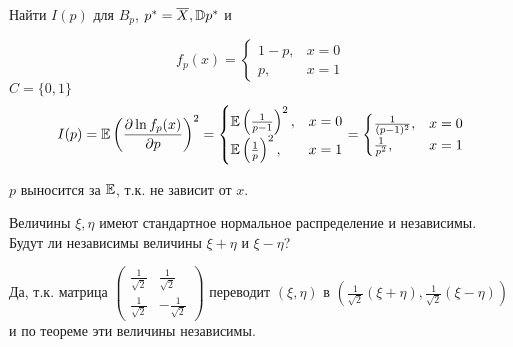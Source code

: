 

\cfoot{}



\begin{exercise}
    Найти \(I(p)\) для \(B_p\), \(p^* = \overline{X}, \mathbb{D} p^*\) и \?
\end{exercise}
\begin{solution}
    \[f_p(x) = \begin{cases}
        1 - p, & x = 0 \\
        p, & x = 1
    \end{cases}\]
    \(C = \{0, 1\}\)
    \[I(p) = \mathbb{E} \left(\frac{\partial \ln f_p(x)}{\partial p}\right)^2 = \begin{cases}
        \mathbb{E} \left(\frac{1}{p - 1}\right)^2, & x = 0 \\
        \mathbb{E} \left(\frac{1}{p}\right)^2, & x = 1
    \end{cases} = \begin{cases}
        \frac{1}{(p - 1)^2}, & x = 0 \\
        \frac{1}{p^2}, & x = 1
    \end{cases}\]
    
    \(p\) выносится за \(\mathbb{E}\), т.к. не зависит от \(x\).
\end{solution}

\begin{exercise}
    Величины \(\xi, \eta\) имеют стандартное нормальное распределение и независимы. Будут ли независимы величины \(\xi + \eta\) и \(\xi - \eta\)?
\end{exercise}
\begin{solution}
    Да, т.к. матрица \(\begin{pmatrix}
        \frac{1}{\sqrt{2}} & \frac{1}{\sqrt{2}} \\
        \frac{1}{\sqrt{2}} & - \frac{1}{\sqrt{2}}
    \end{pmatrix}\) переводит \((\xi, \eta)\) в \((\frac{1}{\sqrt{2}}(\xi + \eta), \frac{1}{\sqrt{2}}(\xi - \eta))\) и по теореме эти величины независимы.
\end{solution}


